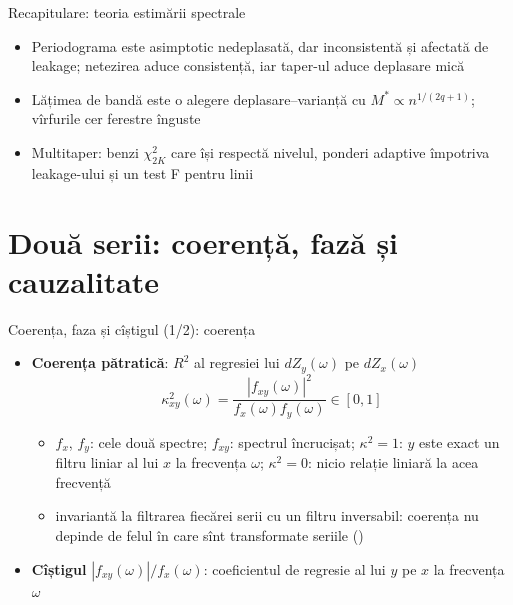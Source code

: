 \begin{frame}{Recapitulare: teoria estimării spectrale}
\itemsize{\small}
\begin{itemize}
    \item Periodograma este asimptotic nedeplasată, dar inconsistentă și afectată de leakage; netezirea aduce consistență, iar taper-ul aduce deplasare mică
    \item Lățimea de bandă este o alegere deplasare--varianță cu $M^* \propto n^{1/(2q+1)}$; vîrfurile cer ferestre înguste
    \item Multitaper: benzi $\chi^2_{2K}$ care își respectă nivelul, ponderi adaptive împotriva leakage-ului și un test F pentru linii
\end{itemize}
\end{frame}


\section{Două serii: coerență, fază și cauzalitate}

\begin{frame}{Coerența, faza și cîștigul (1/2): coerența}
\itemsize{\small}
\begin{itemize}
    \item \textbf{Coerența pătratică}: $R^2$ al regresiei lui $dZ_y(\omega)$ pe $dZ_x(\omega)$
    \[ \kappa^2_{xy}(\omega) = \frac{|f_{xy}(\omega)|^2}{f_x(\omega)f_y(\omega)} \in [0, 1] \]
    \begin{itemize}
        \item $f_x$, $f_y$: cele două spectre; $f_{xy}$: spectrul încrucișat; $\kappa^2 = 1$: $y$ este exact un filtru liniar al lui $x$ la frecvența $\omega$; $\kappa^2 = 0$: nicio relație liniară la acea frecvență
        \item invariantă la filtrarea fiecărei serii cu un filtru inversabil: coerența nu depinde de felul în care sînt transformate seriile ()  %
    \end{itemize}
    \item \textbf{Cîștigul} $|f_{xy}(\omega)|/f_x(\omega)$: coeficientul de regresie al lui $y$ pe $x$ la frecvența $\omega$
\end{itemize}
\end{frame}

